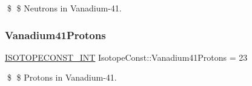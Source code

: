 \$ \$ Neutrons in Vanadium-\/41. \mbox{\label{group___isotope_const-_vanadium-_v41_ga08552ad056a73023324b3ae0def058d3}} 
\subsubsection{\texorpdfstring{Vanadium41\+Protons}{Vanadium41Protons}}
{\footnotesize\ttfamily \mbox{\hyperlink{group___isotope_const-_macros_ga5f18360b3e99483a35c32d789e62621c}{I\+S\+O\+T\+O\+P\+E\+C\+O\+N\+S\+T\+\_\+\+I\+NT}} Isotope\+Const\+::\+Vanadium41\+Protons = 23}

\$ \$ Protons in Vanadium-\/41. 